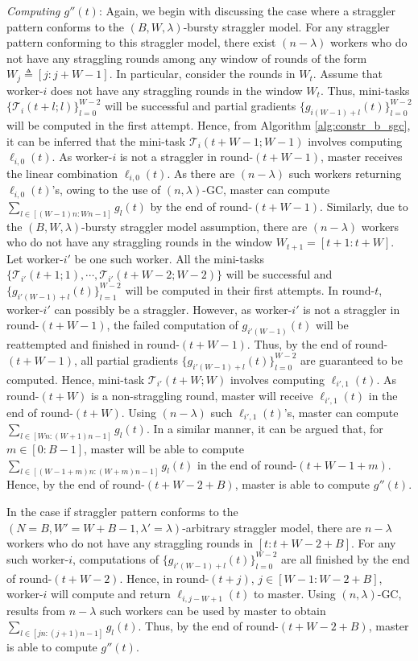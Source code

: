 \textit{Computing $g''(t)$}: Again, we begin with discussing the case where a straggler pattern conforms to the $(B,W,\lambda)$-bursty straggler model. For any straggler pattern  conforming to this straggler model, there exist $(n-\lambda)$ workers who do not have any straggling rounds among any window of rounds of the form $W_j\triangleq [j:j+W-1]$. In particular, consider the rounds in $W_{t}$. Assume that worker-$i$ does not have any straggling rounds in the window $W_t$. Thus, mini-tasks $\{\mathcal{T}_i(t+l;l)\}_{l=0}^{W-2}$ will be successful and partial gradients $\{g_{i(W-1)+l}(t)\}_{l=0}^{W-2}$ will be computed in the first attempt. Hence, from Algorithm \ref{alg:constr_b_sgc}, it can be inferred that the mini-task $\mathcal{T}_i(t+W-1;W-1)$ involves computing $\ell_{i,0}(t)$. As worker-$i$ is not a straggler in round-$(t+W-1)$, master receives the linear combination $\ell_{i,0}(t)$. As there are $(n-\lambda)$ such workers returning $\ell_{i,0}(t)$'s, owing to the use of $(n,\lambda)$-GC, master can compute $\sum_{l\in[(W-1)n:Wn-1]}g_{l}(t)$ by the end of round-$(t+W-1)$. Similarly, due to the $(B,W,\lambda)$-bursty straggler model assumption, there are $(n-\lambda)$ workers who do not have any straggling rounds in the window $W_{t+1}=[t+1:t+W]$. Let worker-$i'$ be one such worker. All the mini-tasks $\{\mathcal{T}_{i'}(t+1;1),\cdots,\mathcal{T}_{i'}(t+W-2;W-2)\}$ will be successful and  $\{g_{i'(W-1)+l}(t)\}_{l=1}^{W-2}$ will be computed in their first attempts. In round-$t$, worker-$i'$ can possibly be a straggler. However, as worker-$i'$ is not a straggler in round-$(t+W-1)$, the failed computation of  $g_{i'(W-1)}(t)$ will be reattempted and finished in round-$(t+W-1)$. Thus, by the end of round-$(t+W-1)$, all partial gradients $\{g_{i'(W-1)+l}(t)\}_{l=0}^{W-2}$  are guaranteed to be computed. Hence, mini-task $\mathcal{T}_{i'}(t+W;W)$ involves computing $\ell_{i',1}(t)$. As round-$(t+W)$ is a non-straggling round, master will receive $\ell_{i',1}(t)$ in the end of round-$(t+W)$. Using $(n-\lambda)$ such $\ell_{i',1}(t)$'s, master can compute $\sum_{l\in[Wn:(W+1)n-1]}g_{l}(t)$. In a similar manner, it can be argued that, for $m\in[0:B-1]$, master will be able to compute $\sum_{l\in[(W-1+m)n:(W+m)n-1]}g_{l}(t)$ in the end of round-$(t+W-1+m)$. Hence, by the end of round-$(t+W-2+B)$, master is able to compute $g''(t)$.


In the case if straggler pattern conforms to the $(N=B,W'=W+B-1,\lambda'=\lambda)$-arbitrary straggler model, there are $n-\lambda$ workers who do not have any straggling rounds in $[t:t+W-2+B]$. For any such worker-$i$, computations of $\{g_{i'(W-1)+l}(t)\}_{l=0}^{W-2}$  are all finished by the end of round-$(t+W-2)$. Hence, in round-$(t+j)$, $j\in[W-1:W-2+B]$, worker-$i$ will compute and return $\ell_{i,j-W+1}(t)$ to master. Using $(n,\lambda)$-GC, results from $n-\lambda$ such workers can be used by master to obtain  $\sum_{l\in[jn:(j+1)n-1]}g_{l}(t)$.  Thus, by the end of round-$(t+W-2+B)$, master is able to compute $g''(t)$. 

